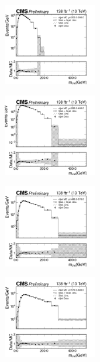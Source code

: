 \begin{figure}[h!]
  \centering
  \begin{subfigure}
    \centering
    \includegraphics[width=0.45\textwidth]{figures/multijet/dijet/dijet_m_200_290.png}
  \end{subfigure}
  \begin{subfigure}
    \centering
    \includegraphics[width=0.45\textwidth]{figures/multijet/dijet/dijet_m_290_480.png}
  \end{subfigure}
  \begin{subfigure}
    \centering
    \includegraphics[width=0.45\textwidth]{figures/multijet/dijet/dijet_m_480_570.png}
  \end{subfigure}
  \begin{subfigure}
    \centering
    \includegraphics[width=0.45\textwidth]{figures/multijet/dijet/dijet_m_570_680.png}

\end{subfigure}
\end{figure}

